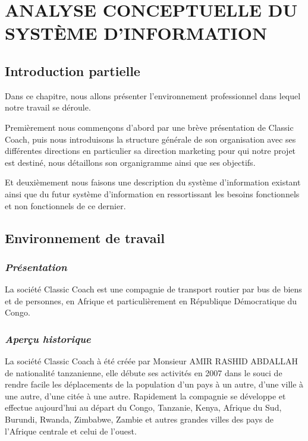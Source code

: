\chapter[ANALYSE CONCEPTUELLE DU SYSTÈME D’INFORMATION]{ANALYSE CONCEPTUELLE DU SYSTÈME D’INFORMATION}
    \section[Introduction partielle]{Introduction partielle}
    Dans ce chapitre, nous allons présenter l’environnement professionnel dans lequel notre
    travail se déroule.
    \par
    Premièrement nous commençons d’abord par une brève présentation de Classic Coach, puis nous introduisons
    la structure générale de son organisation avec ses différentes directions en particulier
    sa direction marketing pour qui notre projet est destiné, nous détaillons son organigramme ainsi
    que ses objectifs. 
    \par
    Et deuxièmement nous faisons une description du système d’information existant ainsi
    que du futur système d’information en ressortissant les besoins fonctionnels et non
    fonctionnels de ce dernier.
    \section[Environnement de travail]{Environnement de travail}
        \subsection[Présentation]{\textit{Présentation}}
        La société Classic Coach est une compagnie de transport routier
        par bus de biens et de personnes, en Afrique et particulièrement
        en République Démocratique du Congo.
        
        \subsection[Aperçu historique]{\textit{Aperçu historique}}
        La société Classic Coach à été créée par Monsieur AMIR RASHID ABDALLAH
        de nationalité tanzanienne, elle débute ses activités en 2007 dans le
        souci de rendre facile les déplacements de la population d’un pays à un autre, d’une ville à une autre,
        d’une citée à une autre. Rapidement la compagnie se développe et effectue
        aujourd’hui au départ du Congo, Tanzanie, Kenya, Afrique du Sud, Burundi,
        Rwanda, Zimbabwe, Zambie et autres grandes villes des pays de l’Afrique
        centrale et celui de l’ouest. 

